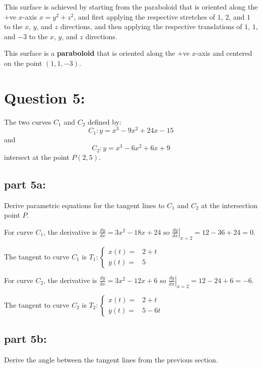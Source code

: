 \documentclass{article}
\newcommand{\at}[1]{\left. #1 \right|}
\newcommand{\dr}[1]{\textcolor{dark_red}{#1}}
\begin{document}
\dr{This surface is achieved by starting from the paraboloid that is oriented along the +ve \(x\)-axis \(x = y^2 + z^2\), and first applying the respective stretches of \(1\), \(2\), and \(1\) to the \(x\), \(y\), and \(z\) directions, and then applying the respective translations of \(1\), \(1\), and \(-3\) to the \(x\), \(y\), and \(z\) directions.}

\dr{This surface is a \textbf{paraboloid} that is oriented along the +ve \(x\)-axis and centered on the point \((1, 1, -3)\).}



\section*{Question 5:}

The two curves \(C_1\) and \(C_2\) defined by:
\[C_1: y = x^3 - 9x^2 + 24x - 15\]
and 
\[C_2: y = x^3 - 6x^2 + 6x + 9\]
intersect at the point \(P(2,5)\). 

\subsection*{part 5a:}

Derive parametric equations for the tangent lines to \(C_1\) and \(C_2\) at the intersection point \(P\).  

\dr{For curve \(C_1\), the derivative is \(\frac{dy}{dx} = 3x^2 - 18x + 24\) so \(\at{\frac{dy}{dx}}_{x=2} = 12 - 36 + 24 = 0\).}

\dr{The tangent to curve \(C_1\) is \(T_1: \left\{\begin{array}{rl} x(t) = & 2 + t \\ y(t) = & 5 \end{array}\right.\)}

\dr{For curve \(C_2\), the derivative is \(\frac{dy}{dx} = 3x^2 - 12x + 6\) so \(\at{\frac{dy}{dx}}_{x=2} = 12 - 24 + 6 = -6\).}

\dr{The tangent to curve \(C_2\) is \(T_2: \left\{\begin{array}{rl} x(t) = & 2 + t \\ y(t) = & 5 - 6t \end{array}\right.\)}


\subsection*{part 5b:}

Derive the angle between the tangent lines from the previous section.
\end{document}
